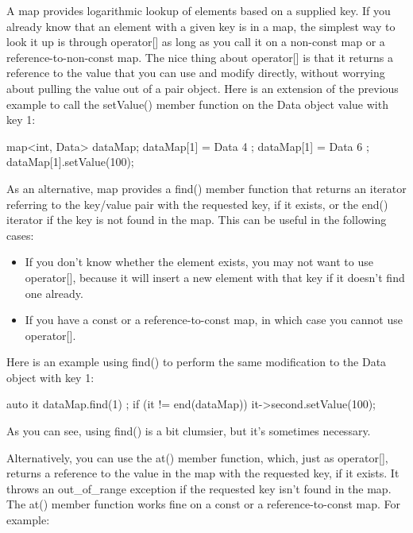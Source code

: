 
A map provides logarithmic lookup of elements based on a supplied key. If you already know that an element with a given key is in a map, the simplest way to look it up is through operator[] as long as you call it on a non-const map or a reference-to-non-const map. The nice thing about operator[] is that it returns a reference to the value that you can use and modify directly, without worrying about pulling the value out of a pair object. Here is an extension of the previous example to call the setValue() member function on the Data object value with key 1:

\begin{cpp}
map<int, Data> dataMap;
dataMap[1] = Data { 4 };
dataMap[1] = Data { 6 };
dataMap[1].setValue(100);
\end{cpp}

As an alternative, map provides a find() member function that returns an iterator referring to the key/value pair with the requested key, if it exists, or the end() iterator if the key is not found in the map. This can be useful in the following cases:

\begin{itemize}
\item
If you don’t know whether the element exists, you may not want to use operator[], because it will insert a new element with that key if it doesn’t find one already.

\item
If you have a const or a reference-to-const map, in which case you cannot use operator[].
\end{itemize}

Here is an example using find() to perform the same modification to the Data object with key 1:

\begin{cpp}
auto it { dataMap.find(1) };
if (it != end(dataMap)) {
    it->second.setValue(100);
}
\end{cpp}

As you can see, using find() is a bit clumsier, but it’s sometimes necessary.

Alternatively, you can use the at() member function, which, just as operator[], returns a reference to the value in the map with the requested key, if it exists. It throws an out\_of\_range exception if the requested key isn’t found in the map. The at() member function works fine on a const or a reference-to-const map. For example:

